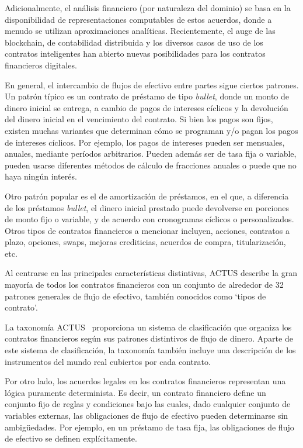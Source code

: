 \documentclass[12pt]{book}
\begin{document}
Adicionalmente, el análisis financiero (por naturaleza del dominio) se basa en la disponibilidad de representaciones computables de estos acuerdos, donde a menudo se utilizan aproximaciones analíticas. Recientemente, el auge de las blockchain, de contabilidad distribuida y los diversos casos de uso de los contratos inteligentes han abierto nuevas posibilidades para los contratos financieros digitales.

En general, el intercambio de flujos de efectivo entre partes sigue ciertos patrones. Un patrón típico es un contrato de préstamo de tipo \textit{bullet}, donde un monto de dinero inicial se entrega, a cambio de pagos de intereses cíclicos y la devolución del dinero inicial en el vencimiento del contrato. Si bien los pagos son fijos, existen muchas variantes que determinan cómo se programan y/o pagan los pagos de intereses cíclicos. Por ejemplo, los pagos de intereses pueden ser mensuales, anuales, mediante períodos arbitrarios. Pueden además ser de tasa fija o variable, pueden usarse diferentes métodos de cálculo de fracciones anuales o puede que no haya ningún interés.

Otro patrón popular es el de amortización de préstamos, en el que, a diferencia de los préstamos \textit{bullet}, el dinero inicial prestado puede devolverse en porciones de monto fijo o variable, y de acuerdo con cronogramas cíclicos o personalizados. Otros tipos de contratos financieros a mencionar incluyen, acciones, contratos a plazo, opciones, swaps, mejoras crediticias, acuerdos de compra, titularización, etc.

Al centrarse en las principales características distintivas, ACTUS describe la gran mayoría de todos los contratos financieros con un conjunto de alrededor de 32 patrones generales de flujo de efectivo, también conocidos como `tipos de contrato'.

La taxonomía ACTUS~\cite{ACTUS_Taxonomy}  proporciona un sistema de clasificación que organiza los contratos financieros según sus patrones distintivos de flujo de dinero. Aparte de este sistema de clasificación, la taxonomía también incluye una descripción de los instrumentos del mundo real cubiertos por cada contrato.

Por otro lado, los acuerdos legales en los contratos financieros representan una lógica puramente determinista. Es decir, un contrato financiero define un conjunto fijo de reglas y condiciones bajo las cuales, dado cualquier conjunto de variables externas, las obligaciones de flujo de efectivo pueden determinarse sin ambigüedades. Por ejemplo, en un préstamo de tasa fija, las obligaciones de flujo de efectivo se definen explícitamente.
\end{document}
